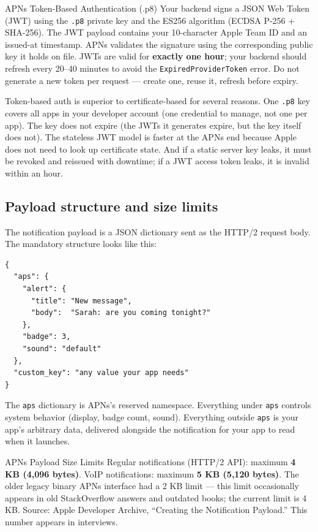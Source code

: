 \documentclass[11pt,a4paper]{article}
\begin{document}
\begin{termbox}{APNs Token-Based Authentication (.p8)}
Your backend signs a JSON Web Token (JWT) using the \texttt{.p8} private key and the ES256 algorithm (ECDSA P-256 + SHA-256). The JWT payload contains your 10-character Apple Team ID and an issued-at timestamp. APNs validates the signature using the corresponding public key it holds on file. JWTs are valid for \textbf{exactly one hour}; your backend should refresh every 20--40 minutes to avoid the \texttt{ExpiredProviderToken} error. Do not generate a new token per request --- create one, reuse it, refresh before expiry.
\end{termbox}

Token-based auth is superior to certificate-based for several reasons. One \texttt{.p8} key covers all apps in your developer account (one credential to manage, not one per app). The key does not expire (the JWTs it generates expire, but the key itself does not). The stateless JWT model is faster at the APNs end because Apple does not need to look up certificate state. And if a static server key leaks, it must be revoked and reissued with downtime; if a JWT access token leaks, it is invalid within an hour.

\subsection{Payload structure and size limits}

The notification payload is a JSON dictionary sent as the HTTP/2 request body. The mandatory structure looks like this:

\begin{verbatim}
{
  "aps": {
    "alert": {
      "title": "New message",
      "body":  "Sarah: are you coming tonight?"
    },
    "badge": 3,
    "sound": "default"
  },
  "custom_key": "any value your app needs"
}
\end{verbatim}

The \texttt{aps} dictionary is APNs's reserved namespace. Everything under \texttt{aps} controls system behavior (display, badge count, sound). Everything outside \texttt{aps} is your app's arbitrary data, delivered alongside the notification for your app to read when it launches.

\begin{industrybox}{APNs Payload Size Limits}
Regular notifications (HTTP/2 API): maximum \textbf{4 KB (4,096 bytes)}. VoIP notifications: maximum \textbf{5 KB (5,120 bytes)}. The older legacy binary APNs interface had a 2 KB limit --- this limit occasionally appears in old StackOverflow answers and outdated books; the current limit is 4 KB. Source: Apple Developer Archive, ``Creating the Notification Payload.'' This number appears in interviews.
\end{industrybox}
\end{document}
